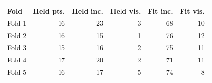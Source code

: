 \begin{tabular}{@{}lrrrrr@{}}
\toprule
Fold & Held pts. & Held inc. & Held vis. & Fit inc. & Fit vis. \\
\midrule
Fold 1 & 16 & 23 & 3 & 68 & 10 \\
Fold 2 & 16 & 15 & 1 & 76 & 12 \\
Fold 3 & 15 & 16 & 2 & 75 & 11 \\
Fold 4 & 17 & 20 & 2 & 71 & 11 \\
Fold 5 & 16 & 17 & 5 & 74 & 8 \\
\bottomrule
\end{tabular}
